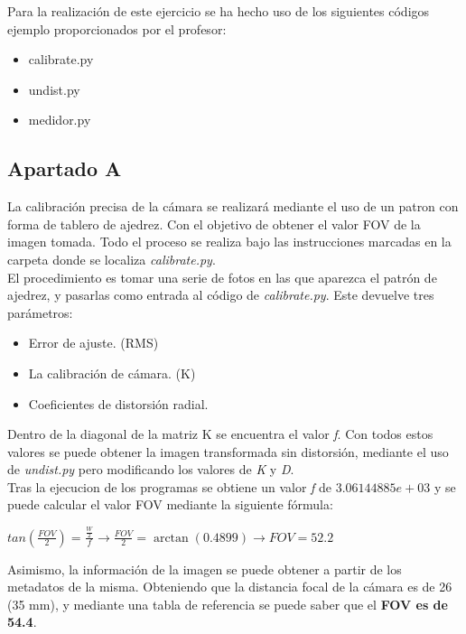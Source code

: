 \documentclass[a4paper]{article} %
\begin{document}
Para la realización de este ejercicio se ha hecho uso de los siguientes códigos ejemplo proporcionados por el profesor:

\begin{itemize}
  \item calibrate.py
  \item undist.py
  \item medidor.py
\end{itemize}

\subsection{Apartado A}
La calibración precisa de la cámara se realizará mediante el uso de un patron con forma de tablero de ajedrez. Con el objetivo de obtener el valor FOV de la imagen tomada. Todo el proceso se realiza bajo las instrucciones marcadas en la carpeta donde se localiza \textit{calibrate.py}.\\

El procedimiento es tomar una serie de fotos en las que aparezca el patrón de ajedrez, y pasarlas como entrada al código de \textit{calibrate.py}. Este devuelve tres parámetros:
\begin{itemize}
	\item Error de ajuste. (RMS)
	\item La calibración de cámara. (K)
	\item Coeficientes de distorsión radial.
\end{itemize}

\vspace{0.3cm}

Dentro de la diagonal de la matriz K se encuentra el valor \textit{f}. Con todos estos valores se puede obtener la imagen transformada sin distorsión, mediante el uso de \textit{undist.py} pero modificando los valores de \textit{K} y \textit{D}.\\

Tras la ejecucion de los programas se obtiene un valor \textit{f} de $3.06144885e+03$ y se puede calcular el valor FOV mediante la siguiente fórmula:

\begin{center}
	$tan(\frac{FOV}{2}) = \frac{\frac{W}{2}}{\textit{f}} \rightarrow \frac{FOV}{2} = \arctan(0.4899) \rightarrow FOV = 52.2$
\end{center}

Asimismo, la información de la imagen se puede obtener a partir de los metadatos de la misma. Obteniendo que la distancia focal de la cámara es de 26 (35 mm), y mediante una tabla de referencia \cite{FOV} se puede saber que el \textbf{FOV es de 54.4}.\ \
\end{document}
